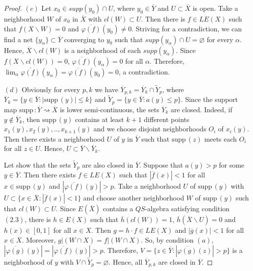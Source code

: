 \documentclass[12pt]{amsart}
\def\supp{{\mathrm {supp}}\,}
\begin{document}
\begin{proof}
$(c)$ Let $x_0\in supp(y_0)\cap U$, where $y_0\in\overline Y$ and $U\subset\overline X$ is open. Take a neighborhood $W$ of $x_0$ in $\overline X$ with
$cl(W)\subset U$. Then there is $f\in LE(X)$ such that $f(X\backslash W)=0$ and $\overline{\varphi(f)}(y_0)\neq 0$.
Striving for a contradiction, we can find a net $\{y_\alpha\}\subset\overline Y$ converging to $y_0$ such that $supp(y_\alpha)\cap U=\varnothing$ for every $\alpha$.
Hence, $\overline X\backslash cl(W)$ is a neighborhood of each $supp(y_\alpha)$. Since $f(X\backslash cl(W))=0$,  $\overline{\varphi(f)}(y_\alpha)=0$ for all $\alpha$. Therefore, 
$\lim_\alpha\overline{\varphi(f)}(y_\alpha)=\overline{\varphi(f)}(y_0)=0$, a contradiction.

$(d)$ Obviously for every $p,k$ we have $\overline Y_{p,k}=\overline Y_{k}\cap\widetilde Y_{p}$, where $\overline Y_{k}=\{y\in\overline Y:|\supp(y)|\leq k\}$ and $\widetilde Y_{p}=\{y\in\overline Y:a(y)\leq p\}$. Since the support map $\supp:\overline Y\rightsquigarrow\overline X$ is lower semi-continuous, the sets 
$\overline Y_{k}$ are closed. Indeed, if $y\not\in\overline Y_{k}$, then $\supp(y)$ contains at least $k+1$ different points $x_1(y),x_2(y),..,x_{k+1}(y)$ and we choose disjoint neighborhoods $O_i$ of $x_i(y)$. Then there exists a neighborhood $U$ of $y$ in $\overline Y$ such that $\supp(z)$ meets each $O_i$ for all $z\in U$. Hence, $U\subset\overline Y\backslash \overline Y_{k}$. 

Let show that the sets $\widetilde Y_{p}$ are also closed in $\overline Y$. Suppose that $a(y)>p$ for some $y\in\overline Y$. 
Then there exists $f\in LE(X)$ such that $|\overline f(x)|<1$ for all $x\in\supp(y)$ and 
$|\overline{\varphi(f)}(y)|>p$. Take
a neighborhood $U$ of $\supp(y)$ with $U\subset\{x\in\overline X:|\overline f(x)|<1\}$ and
choose another neighborhood $W$ of $\supp(y)$ such that $cl(W)\subset U$. Since $E(\overline X)$ contains a $QS$-algebra satisfying condition $(2.3)$,
 there is $h\in E(X)$ such that $\overline h(cl(W))=1$, 
$\overline h(\overline X\backslash U)=0$ and $h(x)\in [0,1]$ for all $x\in X$. Then  
$g=h\cdot f\in LE(X)$ and $|\overline g(x)|<1$ for all $x\in\overline X$. Moreover,
$g|(W\cap X)=f|(W\cap X)$. So, by condition $(a)$, $|\overline{\varphi(g)}(y)|=|\overline{\varphi(f)}(y)|>p$. Therefore, 
$V=\{z\in\overline Y:|\overline{\varphi(g)}(z)|>p\}$ is a neighborhood of $y$ with $V\cap\widetilde Y_{p}=\varnothing$. Hence,  
all $\overline Y_{p,k}$ are closed in $\overline Y$.


\end{proof}
\end{document}
